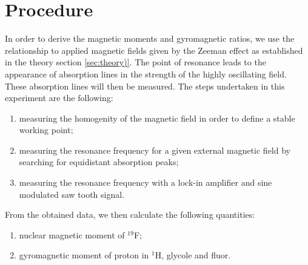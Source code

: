 \section{Procedure}
\label{sec:procedure}
In order to derive the magnetic moments and gyromagnetic ratios, 
we use the relationship to applied magnetic fields given by the Zeeman effect 
as established in the theory section \ref{sec:theory)}. 
The point of resonance leads to the appearance of absorption lines 
in the strength of the highly oscillating field. These absorption lines 
will then be measured. 
The steps undertaken in this experiment are the following:
\begin{enumerate}
\item
measuring the homogenity of the magnetic field in order to define a stable working point;
\item
measuring the resonance frequency for a given external magnetic field by searching for 
equidistant absorption peaks;
\item
measuring the resonance frequency with a lock-in amplifier and sine modulated saw tooth signal.
\end{enumerate}
From the obtained data, we then calculate the following quantities:
\begin{enumerate}
\item
nuclear magnetic moment of $^19$F;
\item
gyromagnetic moment of proton in $^1$H, glycole and fluor.
\end{enumerate}


